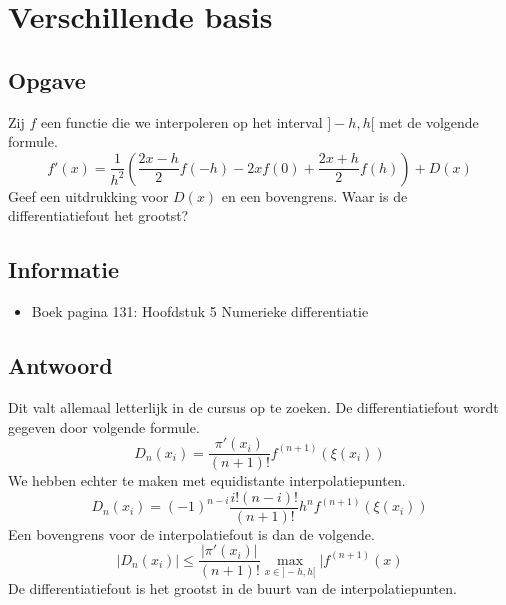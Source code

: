 \documentclass[examenvragen.tex]{subfiles}
\begin{document}
\section{Verschillende basis}

\subsection{Opgave} 
Zij $f$ een functie die we interpoleren op het interval $]-h,h[$ met de volgende formule.
\[
f'(x) = \frac{1}{h^2}\left( \frac{2x-h}{2}f(-h) - 2xf(0) + \frac{2x+h}{2}f(h) \right) + D(x)
\]
Geef een uitdrukking voor $D(x)$ en een bovengrens. Waar is de differentiatiefout het grootst?

\subsection{Informatie}
\begin{itemize}
\item Boek pagina 131: Hoofdstuk 5 Numerieke differentiatie
\end{itemize}

\subsection{Antwoord}
Dit valt allemaal letterlijk in de cursus op te zoeken.
De differentiatiefout wordt gegeven door volgende formule.
\[
D_{n}(x_{i}) = \frac{\pi'(x_{i})}{(n+1)!}f^{(n+1)}(\xi(x_{i})) 
\]
We hebben echter te maken met equidistante interpolatiepunten.
\[
D_{n}(x_i) = (-1)^{n-i}\frac{i!(n-i)!}{(n+1)!}h^{n}f^{(n+1)}(\xi(x_i))
\]
Een bovengrens voor de interpolatiefout is dan de volgende.
\[
|D_{n}(x_i)| \le \frac{|\pi'(x_i)|}{(n+1)!}\max_{x\in]-h,h[}|f^{(n+1)}(x)
\]
De differentiatiefout is het grootst in de buurt van de interpolatiepunten.
\end{document}
